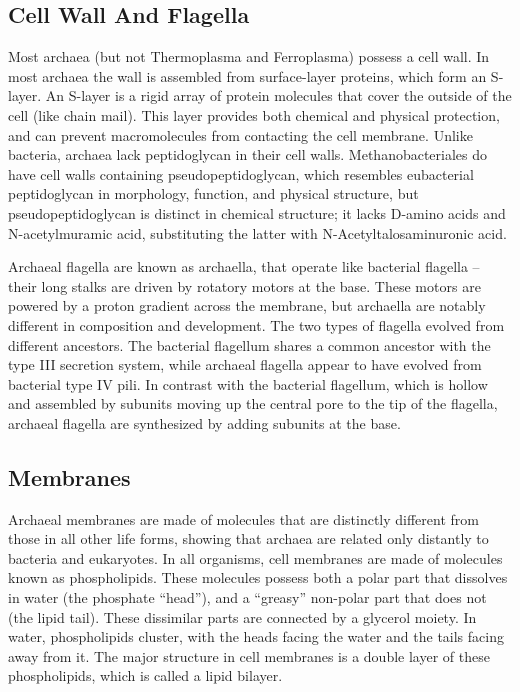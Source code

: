 \hypertarget{cell-wall-and-flagella}{%
\subsection{Cell Wall And Flagella}\label{cell-wall-and-flagella}}

Most archaea (but not Thermoplasma and Ferroplasma) possess a cell wall. In most archaea the wall is assembled from surface-layer proteins, which form an S-layer. An S-layer is a rigid array of protein molecules that cover the outside of the cell (like chain mail). This layer provides both chemical and physical protection, and can prevent macromolecules from contacting the cell membrane. Unlike bacteria, archaea lack peptidoglycan in their cell walls. Methanobacteriales do have cell walls containing pseudopeptidoglycan, which resembles eubacterial peptidoglycan in morphology, function, and physical structure, but pseudopeptidoglycan is distinct in chemical structure; it lacks D-amino acids and N-acetylmuramic acid, substituting the latter with N-Acetyltalosaminuronic acid.

Archaeal flagella are known as archaella, that operate like bacterial flagella -- their long stalks are driven by rotatory motors at the base. These motors are powered by a proton gradient across the membrane, but archaella are notably different in composition and development. The two types of flagella evolved from different ancestors. The bacterial flagellum shares a common ancestor with the type III secretion system, while archaeal flagella appear to have evolved from bacterial type IV pili. In contrast with the bacterial flagellum, which is hollow and assembled by subunits moving up the central pore to the tip of the flagella, archaeal flagella are synthesized by adding subunits at the base.

\hypertarget{membranes}{%
\subsection{Membranes}\label{membranes}}

Archaeal membranes are made of molecules that are distinctly different from those in all other life forms, showing that archaea are related only distantly to bacteria and eukaryotes. In all organisms, cell membranes are made of molecules known as phospholipids. These molecules possess both a polar part that dissolves in water (the phosphate ``head''), and a ``greasy'' non-polar part that does not (the lipid tail). These dissimilar parts are connected by a glycerol moiety. In water, phospholipids cluster, with the heads facing the water and the tails facing away from it. The major structure in cell membranes is a double layer of these phospholipids, which is called a lipid bilayer.

